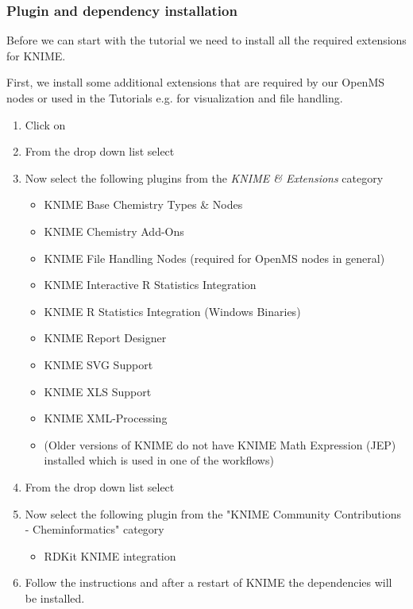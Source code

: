 \subsubsection{Plugin and dependency installation}
\label{Install_plugins}

Before we can start with the tutorial we need to install all the required extensions for KNIME.

First, we install some additional extensions that are required by our OpenMS nodes or used in the Tutorials e.g. for visualization and file handling.
\begin{enumerate}
\item Click on 
\item From the  drop down list select \menu{\KnimeUpdateSite}
\item Now select the following plugins from the \textit{KNIME \& Extensions} category
    \begin{itemize}
    \item KNIME Base Chemistry Types \& Nodes
    \item KNIME Chemistry Add-Ons
    \item KNIME File Handling Nodes (required for OpenMS nodes in general)
    \item KNIME Interactive R Statistics Integration
    \item KNIME R Statistics Integration (Windows Binaries)
    \item KNIME Report Designer
    \item KNIME SVG Support
    \item KNIME XLS Support
    \item KNIME XML-Processing
    \item (Older versions of KNIME do not have KNIME Math Expression (JEP) installed which is used in one of the workflows)
    \end{itemize}
\item From the  drop down list select \\\menu{\KnimeTrustedSite}
\item Now select the following plugin from the "KNIME Community Contributions - Cheminformatics" category 	
    \begin{itemize}
    \item     RDKit KNIME integration
    \end{itemize}	
\item Follow the instructions and after a restart of KNIME the dependencies will be installed.
\end{enumerate}

